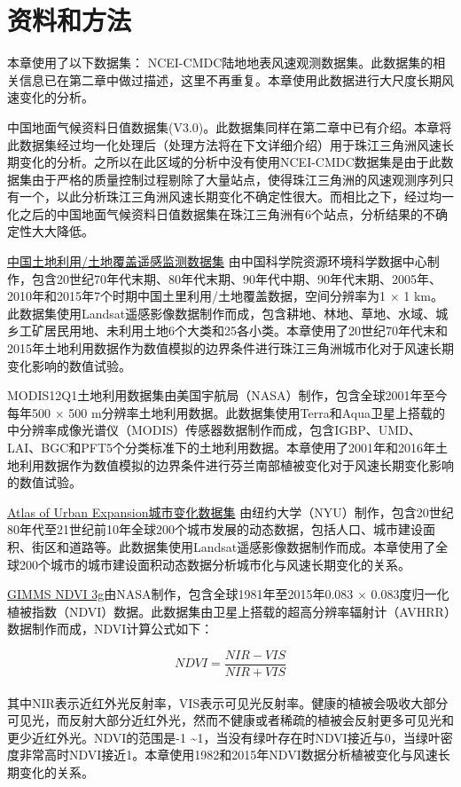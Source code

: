 \section{资料和方法}

本章使用了以下数据集：
NCEI-CMDC陆地地表风速观测数据集。此数据集的相关信息已在第二章中做过描述，这里不再重复。本章使用此数据进行大尺度长期风速变化的分析。

中国地面气候资料日值数据集(V3.0)。此数据集同样在第二章中已有介绍。本章将此数据集经过均一化处理后（处理方法将在下文详细介绍）用于珠江三角洲风速长期变化的分析。之所以在此区域的分析中没有使用NCEI-CMDC数据集是由于此数据集由于严格的质量控制过程剔除了大量站点，使得珠江三角洲的风速观测序列只有一个，以此分析珠江三角洲风速长期变化不确定性很大。而相比之下，经过均一化之后的中国地面气候资料日值数据集在珠江三角洲有6个站点，分析结果的不确定性大大降低。

\href{http://www.resdc.cn}{中国土地利用/土地覆盖遥感监测数据集} 由中国科学院资源环境科学数据中心制作，包含20世纪70年代末期、80年代末期、90年代中期、90年代末期、2005年、2010年和2015年7个时期中国土里利用/土地覆盖数据，空间分辨率为1 $\times$ 1 km。此数据集使用Landsat遥感影像数据制作而成，包含耕地、林地、草地、水域、城乡工矿居民用地、未利用土地6个大类和25各小类。本章使用了20世纪70年代末和2015年土地利用数据作为数值模拟的边界条件进行珠江三角洲城市化对于风速长期变化影响的数值试验。

MODIS12Q1土地利用数据集\citep{sullamenashe2019hierarchical}由美国宇航局（NASA）制作，包含全球2001年至今每年500 $\times$ 500 m分辨率土地利用数据。此数据集使用Terra和Aqua卫星上搭载的中分辨率成像光谱仪（MODIS）传感器数据制作而成，包含IGBP、UMD、LAI、BGC和PFT5个分类标准下的土地利用数据。本章使用了2001年和2016年土地利用数据作为数值模拟的边界条件进行芬兰南部植被变化对于风速长期变化影响的数值试验。

\href{http://www.atlasofurbanexpansion.org/data}{Atlas of Urban Expansion城市变化数据集} 由纽约大学（NYU）制作，包含20世纪80年代至21世纪前10年全球200个城市发展的动态数据，包括人口、城市建设面积、街区和道路等。此数据集使用Landsat遥感影像数据制作而成。本章使用了全球200个城市的城市建设面积动态数据分析城市化与风速长期变化的关系。

\href{https://climatedataguide.ucar.edu/climate-data/ndvi-normalized-difference-vegetation-index-3rd-generation-nasagfsc-gimms}{GIMMS NDVI 3g}由NASA制作，包含全球1981年至2015年0.083 $\times$ 0.083度归一化植被指数（NDVI）数据。此数据集由卫星上搭载的超高分辨率辐射计（AVHRR）数据制作而成，NDVI计算公式如下：

\begin{equation} \label{eq:ndvi}
NDVI = \frac{NIR - VIS}{NIR + VIS}
\end{equation} ~\\
其中NIR表示近红外光反射率，VIS表示可见光反射率。健康的植被会吸收大部分可见光，而反射大部分近红外光，然而不健康或者稀疏的植被会反射更多可见光和更少近红外光。NDVI的范围是-1 \textasciitilde 1，当没有绿叶存在时NDVI接近与0，当绿叶密度非常高时NDVI接近1。本章使用1982和2015年NDVI数据分析植被变化与风速长期变化的关系。

